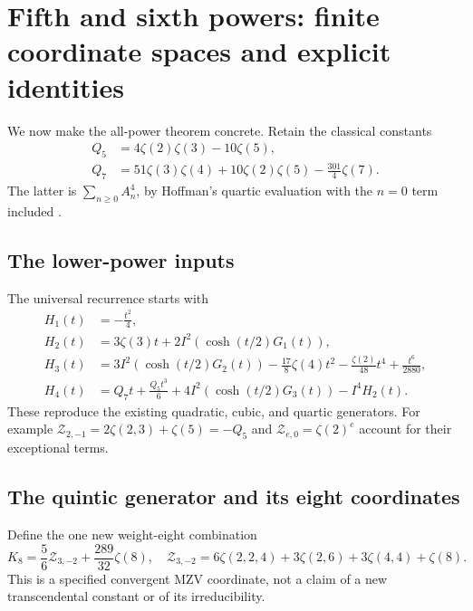 \documentclass[11pt,a4paper]{article}
\numberwithin{equation}{section}
\theoremstyle{definition}
\theoremstyle{remark}
\begin{document}
\section{Fifth and sixth powers: finite coordinate spaces and explicit identities}
\label{tp:sec:examples}

We now make the all-power theorem concrete.  Retain the classical
constants
\begin{align}
 Q_5&=4\zeta(2)\zeta(3)-10\zeta(5),\label{tp:eq:Q5}\\
 Q_7&=51\zeta(3)\zeta(4)+10\zeta(2)\zeta(5)
                       -\frac{301}{4}\zeta(7).\label{tp:eq:Q7}
\end{align}
The latter is $\sum_{n\geq0}A_n^4$, by Hoffman's quartic evaluation
with the $n=0$ term included \cite{HoffmanTails,RepoQuartic}.

\subsection{The lower-power inputs}

The universal recurrence starts with
\begin{align}
 H_1(t)&=-\frac{t^2}{4},\label{tp:eq:H1}\\
 H_2(t)&=3\zeta(3)t+2I^2(\cosh(t/2)G_1(t)),\label{tp:eq:H2}\\
 H_3(t)&=3I^2(\cosh(t/2)G_2(t))
      -\frac{17}{8}\zeta(4)t^2-\frac{\zeta(2)}{48}t^4
      +\frac{t^6}{2880},\label{tp:eq:H3}\\
 H_4(t)&=Q_7t+\frac{Q_5t^3}{6}
      +4I^2(\cosh(t/2)G_3(t))-I^4H_2(t).\label{tp:eq:H4}
\end{align}
These reproduce the existing quadratic, cubic, and quartic generators.
For example $\mathcal Z_{2,-1}=2\zeta(2,3)+\zeta(5)=-Q_5$ and
$\mathcal Z_{e,0}=\zeta(2)^e$ account for their exceptional terms.

\subsection{The quintic generator and its eight coordinates}

Define the one new weight-eight combination
\begin{equation}\label{tp:eq:K8}
 K_8=\frac56\mathcal Z_{3,-2}+\frac{289}{32}\zeta(8),
 \quad
 \mathcal Z_{3,-2}=
 6\zeta(2,2,4)+3\zeta(2,6)+3\zeta(4,4)+\zeta(8).
\end{equation}
This is a specified convergent MZV coordinate, not a claim of a new
transcendental constant or of its irreducibility.
\end{document}
